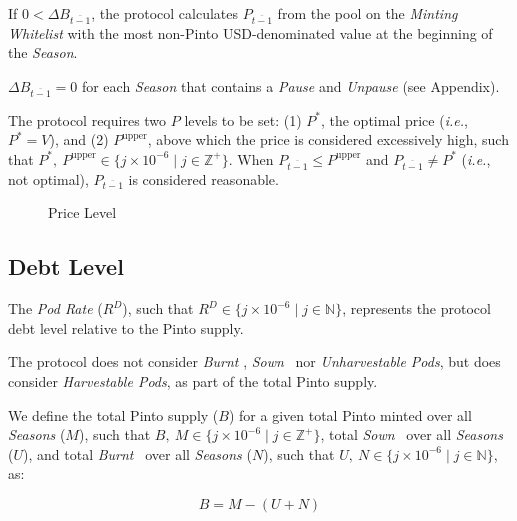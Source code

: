 \documentclass[tikz]{article}
\newcommand{\term}[1]{\textsl{#1}}
\newcommand{\Pinto}{} %
\begin{document}
If $0 < \Delta B_{\overline{t-1}}$, the protocol calculates $P_{\overline{t-1}}$ from the pool on the \term{Minting Whitelist} with the most non-Pinto USD-denominated value at the beginning of the \term{Season}.

$\Delta B_{\overline{t-1}} = 0$ for each \term{Season} that contains a \term{Pause} and \term{Unpause} (see Appendix).

The protocol requires two $P$ levels to be set: (1) $P^{*}$, the optimal price (\textit{i.e.}, $P^{*} = V$), and (2) $P^{\text{upper}}$, above which the price is considered excessively high, such that $P^{*},\ P^{\text{upper}} \in \{j \times 10^{-6} \mid j \in \mathbb{Z}^{+} \}$. When $P_{\overline{t-1}} \leq P^{\text{upper}}$ and $P_{\overline{t-1}} \neq P^{*}$ (\textit{i.e.}, not optimal), $P_{\overline{t-1}}$ is considered reasonable.


\begin{figure}[h!]
    \centering
    
    \vspace*{-7mm}
    \setlength{\belowcaptionskip}{-8pt} %
    \caption{Price Level}
    \label{Price Level}
\end{figure}


\subsection{Debt Level}

The \term{Pod Rate} ($R^{D}$), such that $R^{D} \in \{j \times 10^{-6} \mid j \in \mathbb{N} \}$, represents the protocol debt level relative to the Pinto supply.

The protocol does not consider \term{Burnt} \Pinto, \term{Sown} \Pinto\  nor \term{Unharvestable Pods}, but does consider \term{Harvestable Pods}, as part of the total Pinto supply.

We define the total Pinto supply ($B$) for a given total Pinto minted over all \term{Seasons} ($M$), such that $B,\ M \in \{j \times 10^{-6} \mid j \in \mathbb{Z}^{+} \}$, total \term{Sown} \Pinto\ over all \term{Seasons} ($U$), and total \term{Burnt} \Pinto\ over all \term{Seasons} ($N$), such that $U,\ N \in \{j \times 10^{-6} \mid j \in \mathbb{N} \}$, as:

    $$
        B = M - (U + N)
    $$
\end{document}
